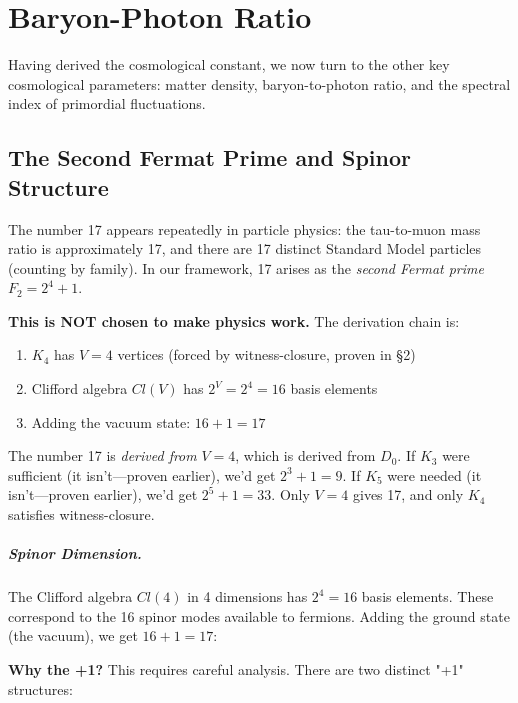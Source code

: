 \documentclass[11pt,a4paper]{book}
\def\text#1{#1}%
\begin{document}
\chapter{Baryon-Photon Ratio}
\label{chap:matter-density}

Having derived the cosmological constant, we now turn to the other key cosmological parameters: matter density, baryon-to-photon ratio, and the spectral index of primordial fluctuations.

\section{The Second Fermat Prime and Spinor Structure}

The number 17 appears repeatedly in particle physics: the tau-to-muon mass ratio is 
approximately 17, and there are 17 distinct Standard Model particles (counting by family). 
In our framework, 17 arises as the \emph{second Fermat prime} $F_2 = 2^4 + 1$.

\textbf{This is NOT chosen to make physics work.} The derivation chain is:
\begin{enumerate}
\item $K_4$ has $V = 4$ vertices (forced by witness-closure, proven in \S 2)
\item Clifford algebra $\text{Cl}(V)$ has $2^V = 2^4 = 16$ basis elements
\item Adding the vacuum state: $16 + 1 = 17$
\end{enumerate}

The number 17 is \emph{derived from} $V = 4$, which is derived from $D_0$. 
If $K_3$ were sufficient (it isn't---proven earlier), we'd get $2^3 + 1 = 9$.
If $K_5$ were needed (it isn't---proven earlier), we'd get $2^5 + 1 = 33$.
Only $V = 4$ gives 17, and only $K_4$ satisfies witness-closure.

\paragraph{Spinor Dimension.}
The Clifford algebra $\text{Cl}(4)$ in 4 dimensions has $2^4 = 16$ basis elements. These 
correspond to the 16 spinor modes available to fermions. Adding the ground state (the 
vacuum), we get $16 + 1 = 17$:

\textbf{Why the +1?} This requires careful analysis. There are two distinct "+1" structures:
\end{document}
